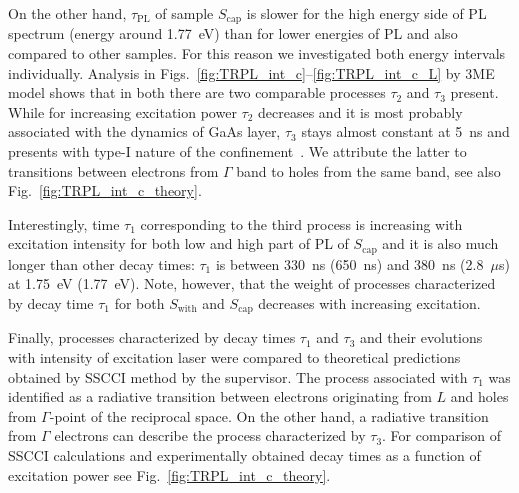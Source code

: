 On the other hand, $\tau_\mathrm{PL}$ of sample $S_\mathrm{cap}$ is slower for the high energy side of PL spectrum (energy around 1.77~eV) than for lower energies of PL and also compared to other samples. For this reason we investigated both energy intervals individually. Analysis in {Figs.~\ref{fig:TRPL_int_c}--\ref{fig:TRPL_int_c_L}} by 3ME model shows that in both there are two comparable processes $\tau_2$ and $\tau_3$ present. While for increasing excitation power $\tau_2$ decreases and it is most probably associated with the dynamics of GaAs layer, $\tau_3$ stays almost constant at 5~ns and presents with type-I nature of the confinement~\cite{Heitz_TRPL_typeI_PRB97}. We attribute the latter to transitions between electrons from $\Gamma$ band to holes from the same band, see also Fig.~\ref{fig:TRPL_int_c_theory}.%








Interestingly, time $\tau_1$ corresponding to the third process is increasing with excitation intensity for both low and high part of PL of $S_\mathrm{cap}$ and it is also much longer than other decay times: $\tau_1$ is between 330~ns (650~ns) and 380~ns (2.8~$\mu$s) at 1.75~eV (1.77~eV). Note, however, that the weight of processes characterized by decay time $\tau_1$ for both $S_\mathrm{with}$ and $S_\mathrm{cap}$ decreases with increasing excitation.


Finally, processes characterized by decay times $\tau_1$ and $\tau_3$ and their evolutions with intensity of excitation laser were compared to theoretical predictions obtained by SSCCI method by the supervisor. The process associated with $\tau_1$ was identified as a radiative transition between electrons originating from $L$ and holes from $\Gamma$-point of the reciprocal space. On the other hand, a radiative transition from $\Gamma$ electrons can describe the process characterized by $\tau_3$. For comparison of SSCCI calculations and experimentally obtained decay times as a function of excitation power see Fig.~\ref{fig:TRPL_int_c_theory}.


